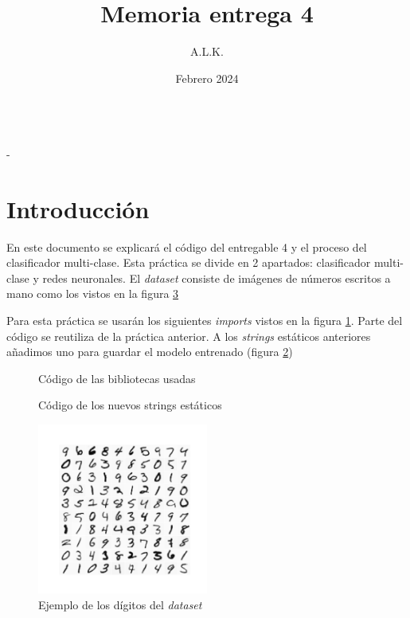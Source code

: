 \documentclass[6pt]{AiTex}
\title{Memoria entrega 4}
\author{A.L.K.}
\date{Febrero 2024}
\begin{document}
\justify

\begin{center}

    {\huge \textbf{\underline{\subtitulo}}} \\
    { \lesson - \autor}

\end{center}


\section*{Introducción}

En este documento se explicará el código del entregable 4 y el proceso del clasificador multi-clase. Esta práctica se divide en 2 apartados: clasificador multi-clase y redes neuronales. El \textit{dataset} consiste de imágenes de números escritos a mano como los vistos en la figura \ref{fig:digitos}

Para esta práctica se usarán los siguientes \textit{imports} vistos en la figura \ref{fig:imports}. Parte del código se reutiliza de la práctica anterior. A los \textit{strings} estáticos anteriores añadimos uno para guardar el modelo entrenado (figura \ref{fig:strings})
\begin{figure}[H]
    \centering
    
    \caption{Código de las bibliotecas usadas}
    \label{fig:imports}
\end{figure}

\begin{figure}[H]
    \centering
    
    \caption{Código de los nuevos strings estáticos}
    \label{fig:strings}
\end{figure}

\begin{figure}[H]
    \centering
    \includegraphics[width=0.5\textwidth]{./imagenes/data.png}
    \caption{Ejemplo de los dígitos del \textit{dataset}}
    \label{fig:digitos}
\end{figure}
\end{document}

